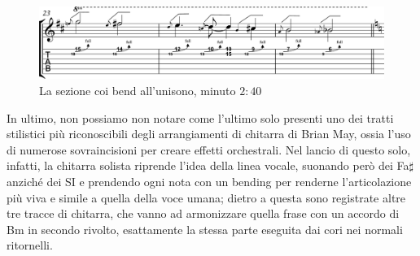\documentclass[12pt]{article}
\begin{document}
\begin{figure}[H]
 \centering
 \includegraphics[width=\textwidth,keepaspectratio]{guitars/guit5}
 \caption{La sezione coi bend all'unisono, minuto \(2:40\)}
 \label{fig:bendSolo}
\end{figure}

In ultimo, non possiamo non notare come l'ultimo solo presenti uno dei tratti stilistici più riconoscibili degli arrangiamenti di chitarra di Brian May, ossia l'uso di numerose sovraincisioni per creare effetti orchestrali. Nel lancio di questo solo, infatti, la chitarra solista riprende l'idea della linea vocale, suonando però dei Fa\(\sharp\) anziché dei SI e  prendendo ogni nota con un bending per renderne l'articolazione più viva e simile a quella della voce umana; dietro a questa sono registrate altre tre tracce di chitarra, che vanno ad armonizzare quella frase con un accordo di Bm in secondo rivolto, esattamente la stessa parte eseguita dai cori nei normali ritornelli.
\end{document}
